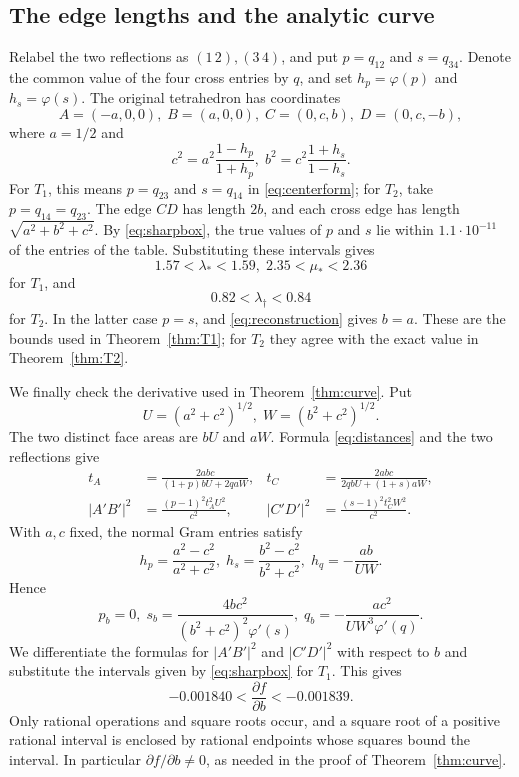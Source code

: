 \documentclass[11pt]{article}
\theoremstyle{definition}
\theoremstyle{remark}
\newcommand{\ph}{\varphi}
\begin{document}
\subsection{The edge lengths and the analytic curve}

Relabel the two reflections as $(1\,2),(3\,4)$, and put $p=q_{12}$ and $s=q_{34}$. Denote the common value of the four cross entries by $q$, and set $h_p=\ph(p)$ and $h_s=\ph(s)$. The original tetrahedron has coordinates
\[
A=(-a,0,0),\; B=(a,0,0),\;
C=(0,c,b),\; D=(0,c,-b),
\]
where $a=1/2$ and
\begin{equation}
c^2=a^2\frac{1-h_p}{1+h_p},\;
b^2=c^2\frac{1+h_s}{1-h_s}.
\label{eq:reconstruction}
\end{equation}
For $T_1$, this means $p=q_{23}$ and $s=q_{14}$ in \eqref{eq:centerform}; for $T_2$, take $p=q_{14}=q_{23}$. The edge $CD$ has length $2b$, and each cross edge has length $\sqrt{a^2+b^2+c^2}$. By \eqref{eq:sharpbox}, the true values of $p$ and $s$ lie within $1.1\cdot10^{-11}$ of the entries of the table. Substituting these intervals gives
\[
1.57<\lambda_*<1.59,\; 2.35<\mu_*<2.36
\]
for $T_1$, and
\[
0.82<\lambda_\dagger<0.84
\]
for $T_2$. In the latter case $p=s$, and \eqref{eq:reconstruction} gives $b=a$. These are the bounds used in Theorem~\ref{thm:T1}; for $T_2$ they agree with the exact value in Theorem~\ref{thm:T2}.

We finally check the derivative used in Theorem~\ref{thm:curve}. Put
\[
U=(a^2+c^2)^{1/2},\; W=(b^2+c^2)^{1/2}.
\]
The two distinct face areas are $bU$ and $aW$. Formula \eqref{eq:distances} and the two reflections give
\[
\begin{aligned}
t_A&=\frac{2abc}{(1+p)bU+2qaW},&
t_C&=\frac{2abc}{2qbU+(1+s)aW},\\
|A'B'|^2&=\frac{(p-1)^2t_A^2U^2}{c^2},&
|C'D'|^2&=\frac{(s-1)^2t_C^2W^2}{c^2}.
\end{aligned}
\]
With $a,c$ fixed, the normal Gram entries satisfy
\[
h_p=\frac{a^2-c^2}{a^2+c^2},\;
h_s=\frac{b^2-c^2}{b^2+c^2},\;
h_q=-\frac{ab}{UW}.
\]
Hence
\[
p_b=0,\;
s_b=\frac{4bc^2}{(b^2+c^2)^2\ph'(s)},\;
q_b=-\frac{ac^2}{UW^3\ph'(q)}.
\]
We differentiate the formulas for $|A'B'|^2$ and $|C'D'|^2$ with respect to $b$ and substitute the intervals given by \eqref{eq:sharpbox} for $T_1$. This gives
\[
-0.001840<\frac{\partial f}{\partial b}<-0.001839.
\]
Only rational operations and square roots occur, and a square root of a positive rational interval is enclosed by rational endpoints whose squares bound the interval. In particular $\partial f/\partial b\ne0$, as needed in the proof of Theorem~\ref{thm:curve}.
\end{document}

